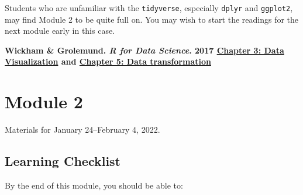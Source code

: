 \documentclass[
  openany]{book}
\newenvironment{yellowbox}{
  \definecolor{shadecolor}{rgb}{254,187,67}  %
  \color{black}
  \begin{shaded}}
 {\end{shaded}}
\begin{document}
Students who are unfamiliar with the \texttt{tidyverse}, especially \texttt{dplyr} and \texttt{ggplot2}, may find Module 2 to be quite full on. You may wish to start the readings for the next module early in this case.

\textbf{Wickham \& Grolemund. \emph{R for Data Science}. 2017 \href{https://r4ds.had.co.nz/data-visualisation.html}{Chapter 3: Data Visualization} and \href{https://r4ds.had.co.nz/transform.html}{Chapter 5: Data transformation}}

\hypertarget{m2}{%
\chapter{Module 2}\label{m2}}

\begin{yellowbox}
Materials for January 24--February 4, 2022.

\end{yellowbox}

\hypertarget{learning-checklist-1}{%
\section{Learning Checklist}\label{learning-checklist-1}}

By the end of this module, you should be able to:
\end{document}
